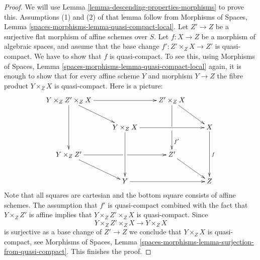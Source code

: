 \documentclass[10pt,a4paper]{amsart}
\theoremstyle{plain}
\theoremstyle{definition}
\theoremstyle{remark}
\numberwithin{equation}{subsection}
\begin{document}
\begin{proof}
We will use
Lemma \ref{lemma-descending-properties-morphisms}
to prove this. Assumptions (1) and (2) of that lemma follow from
Morphisms of Spaces,
Lemma \ref{spaces-morphisms-lemma-quasi-compact-local}.
Let $Z' \to Z$ be a surjective flat morphism of affine schemes over $S$.
Let $f : X \to Z$ be a morphism of algebraic spaces, and assume
that the base change $f' : Z' \times_Z X \to Z'$ is quasi-compact. We have
to show that $f$ is quasi-compact. To see this, using
Morphisms of Spaces,
Lemma \ref{spaces-morphisms-lemma-quasi-compact-local}
again, it is enough to show that for every affine scheme $Y$ and
morphism $Y \to Z$ the fibre product $Y \times_Z X$ is quasi-compact.
Here is a picture:
\begin{equation}
\label{equation-cube}
\vcenter{
\xymatrix{
Y \times_Z Z' \times_Z X \ar[dd] \ar[rr] \ar[rd] & &
Z' \times_Z X \ar'[d][dd]^{f'} \ar[rd] \\
& Y \times_Z X \ar[dd] \ar[rr] & & X \ar[dd]^f \\
Y \times_Z Z' \ar'[r][rr] \ar[rd] & & Z' \ar[rd] \\
& Y \ar[rr] & & Z
}
}
\end{equation}
Note that all squares are cartesian and the bottom square consists
of affine schemes. The assumption that $f'$ is quasi-compact combined with
the fact that $Y \times_Z Z'$ is affine implies that
$Y \times_Z Z' \times_Z X$ is quasi-compact. Since
$$
Y \times_Z Z' \times_Z X \longrightarrow Y \times_Z X
$$
is surjective as a base change of $Z' \to Z$
we conclude that $Y \times_Z X$ is quasi-compact, see
Morphisms of Spaces,
Lemma \ref{spaces-morphisms-lemma-surjection-from-quasi-compact}.
This finishes the proof.
\end{proof}
\end{document}
